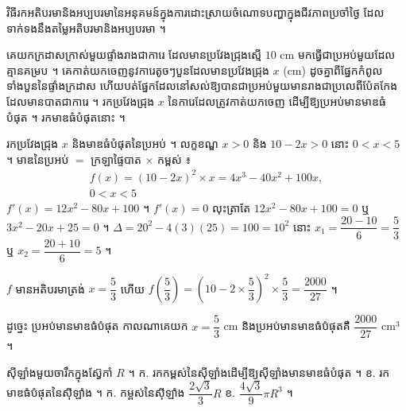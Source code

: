 វិធីរកអតិបរមានិងអប្បបរមានៃអនុគមន៍ក្នុងការដោះស្រាយចំណោទបញ្ហាក្នុងជីវភាពប្រចាំថ្ងៃ ដែលទាក់ទងនឹងតម្លៃអតិបរមានិងអប្បបរមា ។

\begin{example}[លំហាត់គំរូ]
គេយកក្រដាសក្រាស់មួយផ្ទាំងរាងជាការេ ដែលមានប្រវែងជ្រុងស្មើ $10$ cm មកធ្វើជាប្រអប់មួយដែលគ្មានគម្រប ។ គេកាត់យកចេញនូវការេតូចៗបួនដែលមានប្រវែងជ្រុង $x$ (cm) ដូចគ្នាពីផ្នែកកំពូលទាំងបួននៃផ្ទាំងក្រដាស ហើយបត់ផ្នែកដែលនៅសល់ឱ្យបានជាប្រអប់មួយមានរាងជាប្រលេពីប៉ែតកែង ដែលមានបាតជាការេ ។ រកប្រវែងជ្រុង $x$ នៃការេដែលត្រូវកាត់យកចេញ ដើម្បីឱ្យប្រអប់មានមាឌធំបំផុត ។ រកមាឌធំបំផុតនោះ ។
\end{example}

\begin{center}
\end{center}
\ans
រកប្រវែងជ្រុង $x$ និងមាឌធំបំផុតនៃប្រអប់ ។ លក្ខខណ្ឌ $x > 0$ និង $10 - 2x > 0$ នោះ $0 < x < 5$ ។ មាឌនៃប្រអប់ $=$ ក្រឡាផ្ទៃបាត $\times$ កម្ពស់ ៖
\[
\begin{gathered}
f(x) = (10 - 2x)^2\times x = 4x^3 - 40x^2 + 100x,\\
0 < x < 5
\end{gathered}
\]
$f'(x) = 12x^2 - 80x + 100$ ។ $f'(x) = 0$ លុះត្រាតែ $12x^2 - 80x + 100 = 0$ ឬ $3x^2 - 20x + 25 = 0$ ។ $\Delta = 20^2 - 4(3)(25) = 100 = 10^2$ នោះ $x_1 = \dfrac{20 - 10}{6} = \dfrac{5}{3}$ ឬ $x_2 = \dfrac{20 + 10}{6} = 5$ ។
\begin{center}
\end{center}
$f$ មានអតិបរមាត្រង់ $x = \dfrac{5}{3}$ ហើយ $f\left(\dfrac{5}{3}\right) = \left(10 - 2\times\dfrac{5}{3}\right)^2\times\dfrac{5}{3} = \dfrac{2000}{27}$ ។

ដូច្នេះ ប្រអប់មានមាឌធំបំផុត កាលណាគេយក $x = \dfrac{5}{3}$ cm និងប្រអប់មានមាឌធំបំផុតគឺ $\dfrac{2000}{27}$ cm$^3$ ។

\begin{pro}
ស៊ីឡាំងមួយចារឹកក្នុងស្វ៊ែកាំ $R$ ។ \quad ក. រកកម្ពស់នៃស៊ីឡាំងដើម្បីឱ្យស៊ីឡាំងមានមាឌធំបំផុត ។ \quad ខ. រកមាឌធំបំផុតនៃស៊ីឡាំង ។
\ans
ក. កម្ពស់នៃស៊ីឡាំង $\dfrac{2\sqrt{3}}{3}R$ \quad ខ. $\dfrac{4\sqrt{3}}{9}\pi R^3$ ។
\end{pro}

